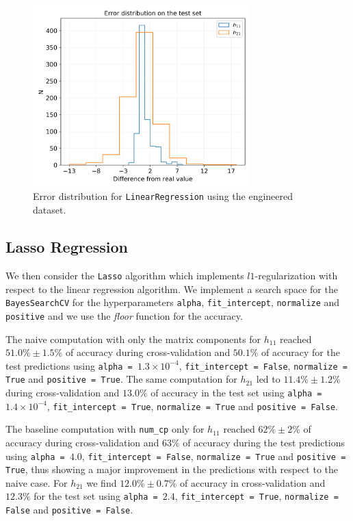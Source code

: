     \begin{figure}[t]
        \centering
        \includegraphics[width=0.75\textwidth]{tex/img/lin_reg_error_eng.png}
        \caption{Error distribution for \texttt{LinearRegression} using the engineered dataset.}
        \label{fig:lin_reg_err}
    \end{figure}
    
\subsection{Lasso Regression}
    We then consider the \texttt{Lasso} algorithm which implements $l1$-regularization with respect to the linear regression algorithm. We implement a search space for the \texttt{BayesSearchCV} for the hyperparameters \texttt{alpha}, \texttt{fit\_intercept}, \texttt{normalize} and \texttt{positive} and we use the \textit{floor} function for the accuracy.
    
    The naive computation with only the matrix components for $h_{11}$ reached $51.0\% \pm 1.5\%$ of accuracy during cross-validation and $50.1\%$ of accuracy for the test predictions using \texttt{alpha = $1.3 \times 10^{-4}$}, \texttt{fit\_intercept = False}, \texttt{normalize = True} and \texttt{positive = True}. The same computation for $h_{21}$ led to $11.4\% \pm 1.2\%$ during cross-validation and $13.0\%$ of accuracy in the test set using \texttt{alpha = $1.4 \times 10^{-4}$}, \texttt{fit\_intercept = True}, \texttt{normalize = True} and \texttt{positive = False}.
    
    The baseline computation with \texttt{num\_cp} only for $h_{11}$ reached $62\% \pm 2\%$ of accuracy during cross-validation and $63\%$ of accuracy during the test predictions using \texttt{alpha = $4.0$}, \texttt{fit\_intercept = False}, \texttt{normalize = True} and \texttt{positive = True}, thus showing a major improvement in the predictions with respect to the naive case. For $h_{21}$ we find $12.0\% \pm 0.7\%$ of accuracy in cross-validation and $12.3\%$ for the test set using \texttt{alpha = $2.4$}, \texttt{fit\_intercept = True}, \texttt{normalize = False} and \texttt{positive = False}.
    
